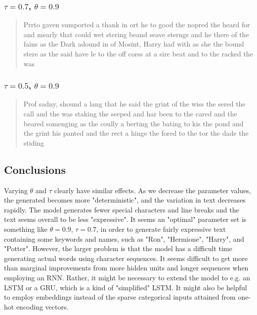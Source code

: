 \documentclass{article}
\begin{document}
\subsubsection*{$\tau=0.7$, $\theta=0.9$}
	\begin{quote}
		Prrto gaven sumported a thank in ort he to good the nopred the heard for and mearly that could wet stering beand seave sterngs and he there of the fains as the Dark adound in of Mosint, Harry had with as she the bound stere as the said have le to the off corss at a sire beat and to the racked the was
	\end{quote}

\subsubsection*{$\tau=0.5$, $\theta=0.9$}
	\begin{quote}
		Prof sadny, shound a lang that he said the grint of the wiss the sered the call and the was staking the seeped and har been to the cared and the beared somenging as the coully a berting the bating to kis the pond and the grint his panted and the rect a hinge the fored to the tor the dade the stiding
	\end{quote}

\subsection*{Conclusions}
	Varying $\theta$ and $\tau$ clearly have similar effects. As we decrease the parameter values, the generated becomes more "deterministic", and the variation in text decreases rapidly. The model generates fewer special characters and line breaks and the text seems overall to be less "expressive". It seems an "optimal" parameter set is something like $\theta=0.9$, $\tau = 0.7$, in order to generate fairly expressive text containing some keywords and names, such as "Ron", "Hermione", "Harry", and "Potter". However, the larger problem is that the model has a difficult time generating actual words using character sequences. It seems difficult to get more than marginal improvements from more hidden units and longer sequences when employing an RNN. Rather, it might be necessary to extend the model to e.g. an LSTM or a GRU, which is a kind of "simplified" LSTM. It might also be helpful to employ embeddings instead of the sparse categorical inputs attained from one-hot encoding vectors. 
\end{document}
